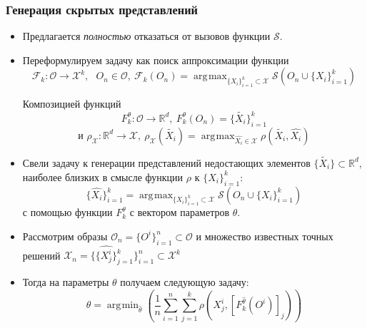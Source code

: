 \documentclass[10pt]{beamer}
\DeclareMathOperator*{\argmax}{\arg\!\max}
\DeclareMathOperator*{\argmin}{\arg\!\min}
\begin{document}
\begin{frame}
	\frametitle{Генерация скрытых представлений}
		\begin{itemize}
			\item Предлагается \textit{полностью} отказаться от вызовов функции $\mathcal{S}$.
			\item Переформулируем задачу как поиск аппроксимации функции 
			$$\mathcal{F}_k: \mathcal{O}\longrightarrow \mathcal{X}^k, ~~~O_n\in \mathcal{O},~ \mathcal{F}_k(O_n) = \argmax_{\{X_i\}_{i=1}^k\subset\mathcal{X}} \mathcal{S}\left(O_n\cup\{X_i\}_{i=1}^k\right)$$
			\vspace{-0.5cm}
			
			Композицией функций 
			\vspace{-0.2cm}
			$$F_k^\theta: \mathcal{O}\longrightarrow \mathbb{R}^d, ~F_k^\theta(O_n) = \{\tilde{X_i}\}_{i=1}^k$$
			\vspace{-0.5cm}
			$$\text{и }\rho_\mathcal{X}: \mathbb{R}^d\longrightarrow \mathcal{X}, ~ \rho_\mathcal{X}(\tilde{X_i}) = \argmax_{\hat{X_i}\in\mathcal{X}}\rho(\tilde{X_i}, \hat{X_i})$$
%
%
			\item Свели задачу к генерации представлений недостающих элементов $\{\tilde{X_i}\}\subset \mathbb{R}^d$, наиболее близких в смысле функции $\rho$ к $\{\hat{X_i}\}_{i=1}^k$:
			$$\{\hat{X_i}\}_{i=1}^k= \argmax_{\{X_i\}_{i=1}^k\subset\mathcal{X}} \mathcal{S}\left(O_n\cup\{X_i\}_{i=1}^k\right)$$
			с помощью функции  $F_k^\theta$ с вектором параметров $\theta$. 
			\item Рассмотрим образы $\mathcal{O}_n = \{O^i\}_{i=1}^n \subset\mathcal{O}$ и множество известных точных решений $\mathcal{X}_n =\{\{\hat{X_j^i}\}_{j=1}^k\}_{i=1}^n\subset\mathcal{X}^k$
			\item Тогда на параметры $\theta$ получаем следующую задачу:
			$$\theta = \argmin_{\hat{\theta}}\left( \frac{1}{n}\sum_{i=1}^n\sum_{j=1}^k\rho\left(X_j^i, [F_k^{\hat{\theta}}(O^i)]_j\right)\right)$$
		\end{itemize}
\end{frame}
\end{document}
